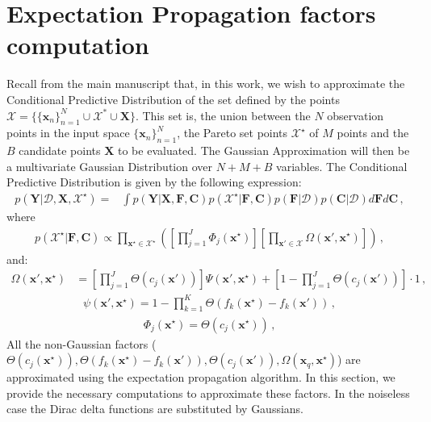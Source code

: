 \section{Expectation Propagation factors computation}

Recall from the main manuscript that, in this work, we wish to approximate the Conditional Predictive Distribution of the set defined by the points $\mathcal{X} = \{\{\boldsymbol{x}_n\}_{n=1}^{N} \cup \mathcal{X}^* \cup \boldsymbol{X}\}$. This set is, the union between the $N$ observation points in the input space $\{\boldsymbol{x}_n\}_{n=1}^{N}$, the Pareto set points $\mathcal{X}^\star$ of $M$ points and the $B$ candidate points $\mathbf{X}$ to be evaluated. The Gaussian Approximation will then be a multivariate Gaussian Distribution over $N+M+B$ variables. The Conditional Predictive Distribution is given by the following expression:
\begin{align}
p(\mathbf{Y}|\mathcal{D},\mathbf{X},\mathcal{X}^\star) = & 
	\int p(\mathbf{Y}|\mathbf{X},\mathbf{F},\mathbf{C}) p(\mathcal{X}^\star|\mathbf{F},\mathbf{C})
	p(\mathbf{F}|\mathcal{D}) p(\mathbf{C}|\mathcal{D}) d\mathbf{F} d \mathbf{C}\,,
	\label{eq:conditional_pred}
\end{align}
where
{\small
\begin{align}
p(\mathcal{X}^\star|\mathbf{F},\mathbf{C}) \propto 
	\prod_{\mathbf{x}^\star \in \mathcal{X}^\star}
	\left( \left[ \prod_{j=1}^J \Phi_j(\mathbf{x}^\star) \right] \left[ \prod_{\mathbf{x}'\in \mathcal{X}}
	\Omega(\mathbf{x}',\mathbf{x}^\star)\right]
	\right)\,,
	\label{eq:prob_pareto_set}
\end{align}}
and:
{\small
\begin{align}
\Omega(\mathbf{x}',\mathbf{x}^\star) &= \left[ \prod_{j=1}^J \Theta(c_j(\mathbf{x}')) \right]
\Psi(\mathbf{x}',\mathbf{x}^\star) + \left[1 - \prod_{j=1}^J \Theta(c_j(\mathbf{x}')) \right] \cdot 1\,,
\end{align}}
\begin{align}
\psi(\textbf{x}',\textbf{x}^{\star}) = 1 - \prod_{k=1}^K \Theta (f_k(\textbf{x}^{\star})-f_k(\textbf{x}'))\,,
\end{align}
\begin{align}
\Phi_j(\mathbf{x}^\star) = \Theta(c_j(\mathbf{x}^\star))\,,
\end{align}
All the non-Gaussian factors ($\Theta(c_j(\mathbf{x}^\star)), \Theta (f_k(\textbf{x}^{\star})-f_k(\textbf{x}')), \Theta(c_j(\mathbf{x}')), \Omega(\textbf{x}_q,\textbf{x}^{\star})$) are approximated using the expectation propagation algorithm. In this section, we provide the necessary computations to approximate these factors. In the noiseless case the Dirac delta functions are substituted by Gaussians.

